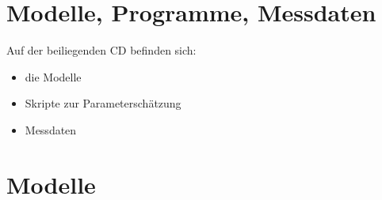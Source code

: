 \appendix
\chapter{Modelle, Programme, Messdaten}
\label{att:cd}
Auf der beiliegenden CD befinden sich:
\begin{itemize}
	\item die Modelle
	\item Skripte zur Parameterschätzung
	\item Messdaten
\end{itemize}

\newpage


\chapter{Modelle}
